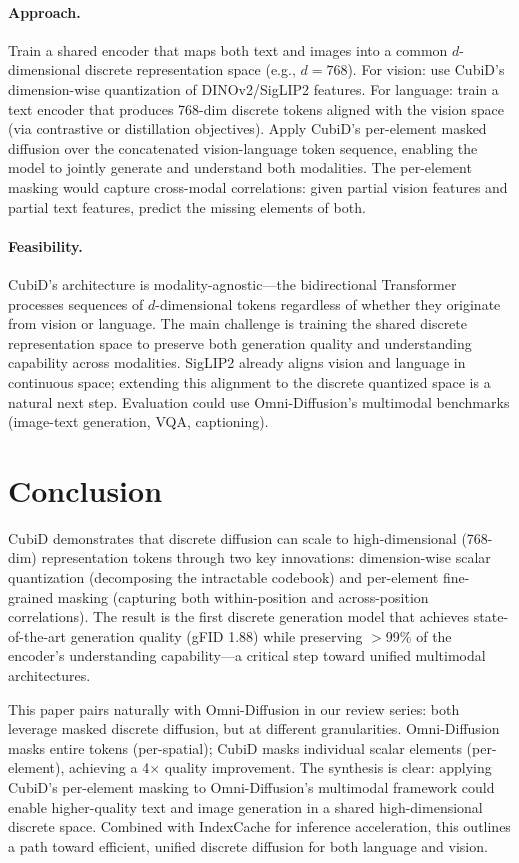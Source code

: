 \documentclass[11pt]{article}
\begin{document}
\paragraph{Approach.}
Train a shared encoder that maps both text and images into a common $d$-dimensional discrete representation space (e.g., $d\!=\!768$).
For vision: use CubiD's dimension-wise quantization of DINOv2/SigLIP2 features.
For language: train a text encoder that produces 768-dim discrete tokens aligned with the vision space (via contrastive or distillation objectives).
Apply CubiD's per-element masked diffusion over the concatenated vision-language token sequence, enabling the model to jointly generate and understand both modalities.
The per-element masking would capture cross-modal correlations: given partial vision features and partial text features, predict the missing elements of both.

\paragraph{Feasibility.}
CubiD's architecture is modality-agnostic---the bidirectional Transformer processes sequences of $d$-dimensional tokens regardless of whether they originate from vision or language.
The main challenge is training the shared discrete representation space to preserve both generation quality and understanding capability across modalities.
SigLIP2 already aligns vision and language in continuous space; extending this alignment to the discrete quantized space is a natural next step.
Evaluation could use Omni-Diffusion's multimodal benchmarks (image-text generation, VQA, captioning).

\section{Conclusion}

CubiD demonstrates that discrete diffusion can scale to high-dimensional (768-dim) representation tokens through two key innovations: dimension-wise scalar quantization (decomposing the intractable codebook) and per-element fine-grained masking (capturing both within-position and across-position correlations).
The result is the first discrete generation model that achieves state-of-the-art generation quality (gFID 1.88) while preserving $>$99\% of the encoder's understanding capability---a critical step toward unified multimodal architectures.

This paper pairs naturally with Omni-Diffusion in our review series: both leverage masked discrete diffusion, but at different granularities.
Omni-Diffusion masks entire tokens (per-spatial); CubiD masks individual scalar elements (per-element), achieving a 4$\times$ quality improvement.
The synthesis is clear: applying CubiD's per-element masking to Omni-Diffusion's multimodal framework could enable higher-quality text and image generation in a shared high-dimensional discrete space.
Combined with IndexCache for inference acceleration, this outlines a path toward efficient, unified discrete diffusion for both language and vision.
\end{document}
